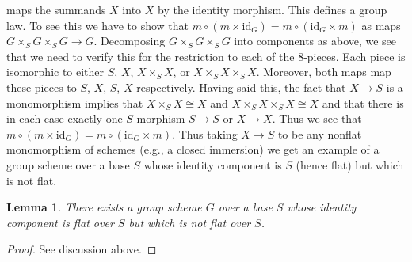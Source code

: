\documentclass[10pt,a4paper]{amsart}
\theoremstyle{plain}
\newtheorem{lemma}[subsection]{Lemma}
\theoremstyle{definition}
\theoremstyle{remark}
\numberwithin{equation}{subsection}
\begin{document}
maps the summands $X$ into $X$ by the identity morphism.
This defines a group law. To see this we have to show that
$m \circ (m \times \text{id}_G) = m \circ (\text{id}_G \times m)$
as maps $G \times_S G \times_S G \to G$. Decomposing
$G \times_S G \times_S G$ into components as above, we see that
we need to verify this for the restriction to each of the $8$-pieces.
Each piece is isomorphic to either $S$, $X$, $X \times_S X$, or
$X \times_S X \times_S X$. Moreover, both maps map these pieces
to $S$, $X$, $S$, $X$ respectively. Having said this, the fact that
$X \to S$ is a monomorphism implies that $X \times_S X \cong X$
and $X \times_S X \times_S X \cong X$ and that there is in each case
exactly one $S$-morphism $S \to S$ or $X \to X$. Thus we see
that $m \circ (m \times \text{id}_G) = m \circ (\text{id}_G \times m)$.
Thus taking $X \to S$ to be any
nonflat monomorphism of schemes (e.g., a closed immersion)
we get an example of a group scheme
over a base $S$ whose identity component is $S$ (hence flat)
but which is not flat.

\begin{lemma}
\label{lemma-non-flat-group-scheme}
There exists a group scheme $G$ over a base $S$ whose identity
component is flat over $S$ but which is not flat over $S$.
\end{lemma}

\begin{proof}
See discussion above.
\end{proof}
\end{document}

